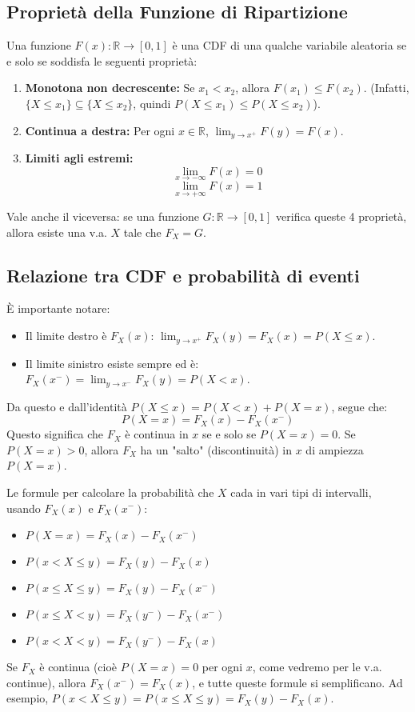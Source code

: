 \subsection{Proprietà della Funzione di Ripartizione}
Una funzione $F(x): \mathbb{R} \to [0,1]$ è una CDF di una qualche variabile aleatoria se e solo se soddisfa le seguenti proprietà:
\begin{enumerate}
    \item \textbf{Monotona non decrescente:} Se $x_1 < x_2$, allora $F(x_1) \le F(x_2)$.
    (Infatti, $\{X \le x_1\} \subseteq \{X \le x_2\}$, quindi $P(X \le x_1) \le P(X \le x_2)$).
    \item \textbf{Continua a destra:} Per ogni $x \in \mathbb{R}$, $\lim_{y \to x^+} F(y) = F(x)$.
    \item \textbf{Limiti agli estremi:}
    \[ \lim_{x \to -\infty} F(x) = 0 \]
    \[ \lim_{x \to +\infty} F(x) = 1 \]
\end{enumerate}
Vale anche il viceversa: se una funzione $G: \mathbb{R} \to [0,1]$ verifica queste 4 proprietà, allora esiste una v.a. $X$ tale che $F_X = G$.

\subsection{Relazione tra CDF e probabilità di eventi}
È importante notare:
\begin{itemize}
    \item Il limite destro è $F_X(x)$: $\lim_{y \to x^+} F_X(y) = F_X(x) = P(X \le x)$.
    \item Il limite sinistro esiste sempre ed è: $F_X(x^-) = \lim_{y \to x^-} F_X(y) = P(X < x)$.
\end{itemize}
Da questo e dall'identità $P(X \le x) = P(X < x) + P(X = x)$, segue che:
\[ P(X = x) = F_X(x) - F_X(x^-) \]
Questo significa che $F_X$ è continua in $x$ se e solo se $P(X=x)=0$. Se $P(X=x)>0$, allora $F_X$ ha un "salto" (discontinuità) in $x$ di ampiezza $P(X=x)$.

Le formule per calcolare la probabilità che $X$ cada in vari tipi di intervalli, usando $F_X(x)$ e $F_X(x^-)$:
\begin{itemize}
    \item $P(X = x) = F_X(x) - F_X(x^-)$
    \item $P(x < X \le y) = F_X(y) - F_X(x)$
    \item $P(x \le X \le y) = F_X(y) - F_X(x^-)$
    \item $P(x \le X < y) = F_X(y^-) - F_X(x^-)$
    \item $P(x < X < y) = F_X(y^-) - F_X(x)$
\end{itemize}
Se $F_X$ è continua (cioè $P(X=x)=0$ per ogni $x$, come vedremo per le v.a. continue), allora $F_X(x^-) = F_X(x)$, e tutte queste formule si semplificano. Ad esempio, $P(x < X \le y) = P(x \le X \le y) = F_X(y) - F_X(x)$.


